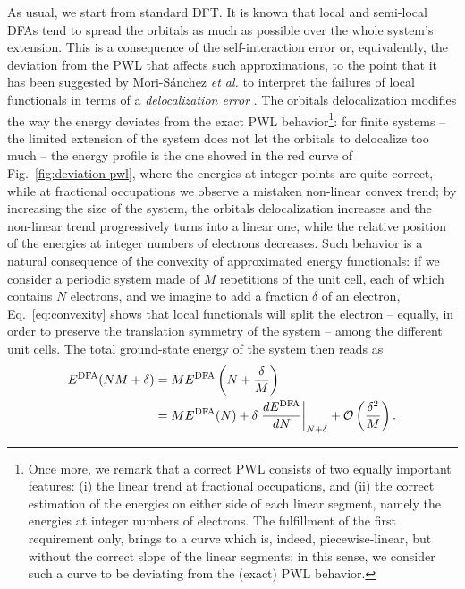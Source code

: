 As usual, we start from standard DFT. It is known that local and semi-local DFAs tend to spread the orbitals as much as possible over the whole system's extension. This is a consequence of the self-interaction error or, equivalently, the deviation from the PWL that affects such approximations, to the point that it has been suggested by Mori-S\'{a}nchez \emph{et al.} to interpret the failures of local functionals in terms of a \emph{delocalization error} \cite{mori-sanchez_localization_2008}. The orbitals delocalization modifies the way the energy deviates from the exact PWL behavior\footnote{Once more, we remark that a correct PWL consists of two equally important features: (i) the linear trend at fractional occupations, and (ii) the correct estimation of the energies on either side of each linear segment, namely the energies at integer numbers of electrons. The fulfillment of the first requirement only, brings to a curve which is, indeed, piecewise-linear, but without the correct slope of the linear segments; in this sense, we consider such a curve to be deviating from the (exact) PWL behavior.}: for finite systems -- the limited extension of the system does not let the orbitals to delocalize too much -- the energy profile is the one showed in the red curve of Fig.~\ref{fig:deviation-pwl}, where the energies at integer points are quite correct, while at fractional occupations we observe a mistaken non-linear convex trend; by increasing the size of the system, the orbitals delocalization increases and the non-linear trend progressively turns into a linear one, while the relative position of the energies at integer numbers of electrons decreases. Such behavior is a natural consequence of the convexity of approximated energy functionals: if we consider a periodic system made of $M$ repetitions of the unit cell, each of which contains $N$ electrons, and we imagine to add a fraction $\delta$ of an electron, Eq.~\eqref{eq:convexity} shows that local functionals will split the electron -- equally, in order to preserve the translation symmetry of the system -- among the different unit cells. The total ground-state energy of the system then reads as \cite{mori-sanchez_localization_2008}
%
\begin{equation}
    \begin{split}
    E^{\rm DFA}(NM + \delta) &= M E^{\rm DFA}\left( N + \frac{\delta}{M} \right) \\
    &= ME^{\rm DFA}(N) + \delta \left. \frac{dE^{\rm DFA}}{dN} \right|_{N+\delta} + \mathcal{O} \left( \frac{\delta^2}{M} \right) .
    \end{split}
    \label{eq:pwl-convex-to-linear}
\end{equation}
